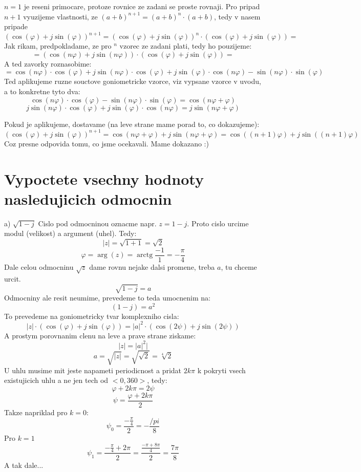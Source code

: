  $n=1$ je reseni primocare, protoze rovnice ze zadani se proste rovnaji. Pro pripad $n+1$ vyuzijeme vlastnosti, ze $(a+b)^{n+1}=(a+b)^n \cdot (a+b)$, tedy v nasem pripade $$(\operatorname{cos}(\varphi)+j\operatorname{sin}(\varphi))^{n+1} = (\operatorname{cos}(\varphi)+j\operatorname{sin}(\varphi))^{n}\cdot (\operatorname{cos}(\varphi)+j\operatorname{sin}(\varphi)) = $$
 Jak rikam, predpokladame, ze pro $^n$ vzorec ze zadani plati, tedy ho pouzijeme:
 $$= (\operatorname{cos}(n\varphi)+j\operatorname{sin}(n\varphi)) \cdot (\operatorname{cos}(\varphi)+j\operatorname{sin}(\varphi)) = $$
 A ted zavorky roznasobime:
 $$ = \operatorname{cos}(n\varphi)\cdot \operatorname{cos}(\varphi)+j\operatorname{sin}(n\varphi)\cdot \operatorname{cos}(\varphi) + j\operatorname{sin}(\varphi)\cdot \operatorname{cos}(n\varphi) - \operatorname{sin}(n\varphi)\cdot \operatorname{sin}(\varphi) $$
 Ted aplikujeme ruzne souctove goniometricke vzorce, viz vypsane vzorce v uvodu, a to konkretne tyto dva:
  $$\operatorname{cos}(n\varphi)\cdot \operatorname{cos}(\varphi) - \operatorname{sin}(n\varphi)\cdot \operatorname{sin}(\varphi) = \operatorname{cos}(n\varphi + \varphi)$$
  $$j\operatorname{sin}(n\varphi)\cdot \operatorname{cos}(\varphi) + j\operatorname{sin}(\varphi)\cdot \operatorname{cos}(n\varphi) = j \operatorname{sin}(n\varphi+\varphi)$$
  
  Pokud je aplikujeme, dostavame (na leve strane mame porad to, co dokazujeme):
  $$(\operatorname{cos}(\varphi)+j\operatorname{sin}(\varphi))^{n+1} =\operatorname{cos}(n\varphi + \varphi)+j \operatorname{sin}(n\varphi+\varphi) = \operatorname{cos}((n+1)\varphi)+j\operatorname{sin}((n+1)\varphi) $$
  Coz presne odpovida tomu, co jsme ocekavali. Mame dokazano :)
 
 \section{Vypoctete vsechny hodnoty nasledujicich odmocnin}
 a) $\sqrt{1-j}$
 Cislo pod odmocninou oznacme napr. $z=1-j$. Proto cislo urcime modul (velikost) a argument (uhel). Tedy:
 $$|z|=\sqrt{1+1} = \sqrt{2}$$
$$\varphi=\operatorname{arg}(z) = \operatorname{arctg}\frac{-1}{1} = -\frac{\pi}{4}$$ 
  Dale celou odmocninu $\sqrt{z}$ dame rovnu nejake dalsi promene, treba $a$, tu chceme urcit.
 $$\sqrt{1-j}= a$$
 Odmocniny ale resit neumime, prevedeme to teda umocnenim na:
 $$(1-j) = a^2$$
 To prevedeme na goniometricky tvar komplexniho cisla:
 $$|z|\cdot (\operatorname{cos}(\varphi)+j \operatorname{sin}(\varphi)) = |a|^2 \cdot  (\operatorname{cos}(2\psi)+j \operatorname{sin}(2\psi))$$
 A prostym porovnanim clenu na leve a prave strane ziskame:
 $$|z|=|a|^2|$$
 $$a=\sqrt{|z|} = \sqrt{\sqrt{2}} = \sqrt[4]{2}$$
 U uhlu musime mit jeste napameti periodicnost a pridat $2k\pi$ k pokryti vsech existujicich uhlu a ne jen tech od $<0, 360>$, tedy:
 $$\varphi+2k\pi = 2\psi$$
 $$\psi = \frac{\varphi+2k\pi}{2}$$
 Takze napriklad pro $k=0$:
 $$\psi_0 = \frac{-\frac{\pi}{4}}{2} = -\frac{/pi}{8}$$
 Pro $k=1$
 $$\psi_1 = \frac{-\frac{\pi}{4}+2\pi}{2}=\frac{\frac{-\pi+8\pi}{4}}{2}=\frac{7\pi}{8}$$
 A tak dale... 
 
